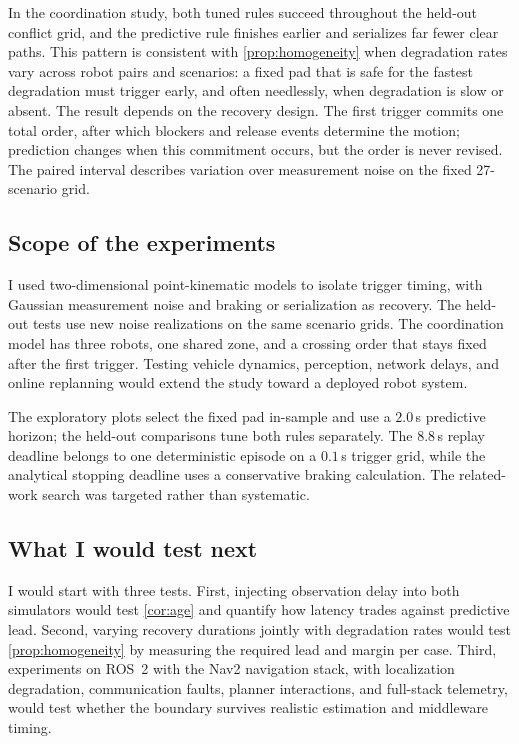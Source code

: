 In the coordination study, both tuned rules succeed throughout the held-out
conflict grid, and the predictive rule finishes earlier and serializes far fewer
clear paths.  This pattern is consistent with \cref{prop:homogeneity} when
degradation rates vary across robot pairs and scenarios: a fixed pad that is
safe for the fastest degradation must trigger early, and often needlessly, when
degradation is slow or absent.  The result depends on the recovery
design.  The first trigger commits one total order, after which blockers and
release events determine the motion; prediction changes when this commitment
occurs, but the order is never revised.  The paired interval describes variation
over measurement noise on the fixed 27-scenario grid.

\subsection{Scope of the experiments}
\label{sec:limitations}

I used two-dimensional point-kinematic models to isolate trigger timing, with
Gaussian measurement noise and braking or serialization as recovery.  The
held-out tests use new noise realizations on the same scenario grids.  The
coordination model has three robots, one shared zone, and a crossing order that
stays fixed after the first trigger.  Testing vehicle dynamics, perception,
network delays, and online replanning would extend the study toward a deployed
robot system.

The exploratory plots select the fixed pad in-sample and use a $2.0$\,s
predictive horizon; the held-out comparisons tune both rules separately.  The
$8.8$\,s replay deadline belongs to one deterministic episode on a $0.1$\,s
trigger grid, while the analytical stopping deadline uses a conservative
braking calculation.  The related-work search was targeted rather than
systematic.

\subsection{What I would test next}

I would start with three tests.  First, injecting observation delay into both
simulators would test \cref{cor:age} and quantify how latency trades against
predictive lead.  Second, varying recovery durations jointly with degradation
rates would test \cref{prop:homogeneity} by measuring the required lead and
margin per case.  Third, experiments on ROS~2 with the Nav2 navigation stack,
with localization degradation, communication faults, planner interactions, and
full-stack telemetry, would test whether the boundary survives realistic
estimation and middleware timing.
